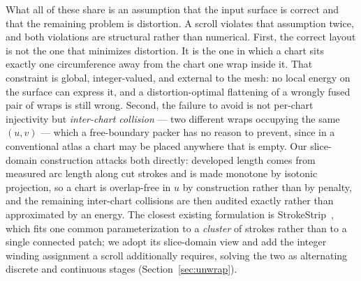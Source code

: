 What all of these share is an assumption that the input surface is correct and that the remaining problem is distortion. A scroll violates that assumption twice, and both violations are structural rather than numerical. First, the correct layout is not the one that minimizes distortion. It is the one in which a chart sits exactly one circumference away from the chart one wrap inside it. That constraint is global, integer-valued, and external to the mesh: no local energy on the surface can express it, and a distortion-optimal flattening of a wrongly fused pair of wraps is still wrong. Second, the failure to avoid is not per-chart injectivity but {\em inter-chart collision} --- two different wraps occupying the same $(u,v)$ --- which a free-boundary packer has no reason to prevent, since in a conventional atlas a chart may be placed anywhere that is empty. Our slice-domain construction attacks both directly: developed length comes from measured arc length along cut strokes and is made monotone by isotonic projection, so a chart is overlap-free in $u$ by construction rather than by penalty, and the remaining inter-chart collisions are then audited exactly rather than approximated by an energy. The closest existing formulation is StrokeStrip~\cite{pagurek2021strokestrip}, which fits one common parameterization to a {\em cluster} of strokes rather than to a single connected patch; we adopt its slice-domain view and add the integer winding assignment a scroll additionally requires, solving the two as alternating discrete and continuous stages (Section~\ref{sec:unwrap}).


